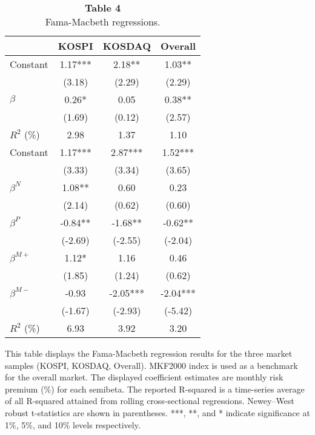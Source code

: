 \documentclass{article}
\begin{document}
\begin{table}[h]
    \begin{threeparttable}
    \captionsetup{justification=raggedright,singlelinecheck=false}
    \caption*{\textbf{Table 4}\\Fama-Macbeth regressions.}
    \label{tab:comparison_sub_periods}
    \begin{tabular}{l@{\extracolsep{8em}}ccc}
        \toprule
        & KOSPI & KOSDAQ & Overall \\
        \midrule
        Constant & 1.17*** & 2.18** & 1.03** \\
                 & (3.18) & (2.29) & (2.29) \\[0.5em]
        $\beta$ & 0.26* & 0.05 & 0.38** \\
                & (1.69) & (0.12) & (2.57) \\
        \midrule
        $R^2$ (\%) & 2.98 & 1.37 & 1.10 \\
        \midrule
        Constant & 1.17*** & 2.87*** & 1.52*** \\
                 & (3.33) & (3.34) & (3.65) \\[0.5em]
        $\beta^N$ & 1.08** & 0.60 & 0.23 \\
                  & (2.14) & (0.62) & (0.60) \\[0.5em]
        $\beta^P$ & -0.84** & -1.68** & -0.62** \\
                  & (-2.69) & (-2.55) & (-2.04) \\[0.5em]
        $\beta^{M+}$ & 1.12* & 1.16 & 0.46 \\
                    & (1.85) & (1.24) & (0.62) \\[0.5em]
        $\beta^{M-}$ & -0.93& -2.05*** & -2.04*** \\
                     & (-1.67) & (-2.93) & (-5.42) \\
        \midrule
        $R^2$ (\%) & 6.93 & 3.92 & 3.20 \\
        \bottomrule
    \end{tabular}
    \begin{tablenotes}
      \item This table displays the Fama-Macbeth regression results for the three market samples (KOSPI, KOSDAQ, Overall). MKF2000 index is used as a benchmark for the overall market. The displayed coefficient estimates are monthly risk premium (\%) for each semibeta. The reported R-squared is a time-series average of all R-squared attained from rolling cross-sectional regressions. Newey–West robust t-statistics are shown in parentheses. ***, **, and * indicate significance at 1\%, 5\%, and 10\% levels respectively.
    \end{tablenotes}
  \end{threeparttable}
\end{table}
\end{document}
